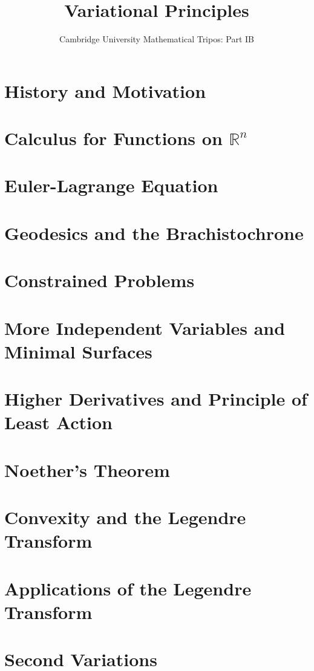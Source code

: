 \documentclass{article}
\title{Variational Principles}
\author{Cambridge University Mathematical Tripos: Part IB}
\begin{document}
\maketitle

\tableofcontentsnewpage{}

\section{History and Motivation}

\section{Calculus for Functions on \(\mathbb R^n\)}

\section{Euler-Lagrange Equation}

\section{Geodesics and the Brachistochrone}

\section{Constrained Problems}

\section{More Independent Variables and Minimal Surfaces}

\section{Higher Derivatives and Principle of Least Action}

\section{Noether's Theorem}

\section{Convexity and the Legendre Transform}

\section{Applications of the Legendre Transform}

\section{Second Variations}

\end{document}
